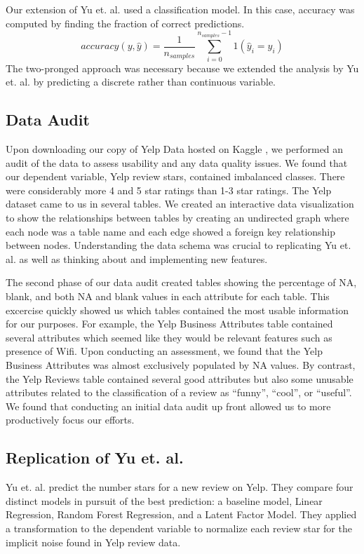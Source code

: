 \documentclass[12pt]{article}
\begin{document}
Our extension of Yu et. al. \cite{yu2015restaurants} used a classification model. In this
case, accuracy was computed by finding the fraction of correct predictions.
\[
accuracy(y, \hat{y}) = \frac{1}{n_{samples}} \sum_{i=0}^{n_{samples} - 1} 1(\hat{y}_i = y_i)
\]
The two-pronged approach was necessary because we extended the analysis by Yu et. al.
\cite{yu2015restaurants} by predicting a discrete rather than continuous variable.

\subsection{Data Audit}

Upon downloading our copy of Yelp Data hosted on Kaggle \cite{YelpData59:online}, we performed
an audit of the data to assess usability and any data quality issues. We found that our
dependent variable, Yelp review stars, contained imbalanced classes. There were considerably
more 4 and 5 star ratings than 1-3 star ratings. The Yelp dataset came to us in several tables.
We created an interactive data visualization to show the relationships between tables by creating
an undirected graph where each node was a table name and each edge showed a foreign key
relationship between nodes. Understanding the data schema was crucial to replicating
Yu et. al. \cite{yu2015restaurants} as well as thinking about and implementing new features.

The second phase of our data audit created tables showing the percentage of NA, blank, and
both NA and blank values in each attribute for each table. This excercise quickly showed us
which tables contained the most usable information for our purposes. For example, the Yelp
Business Attributes table contained several attributes which seemed like they would be
relevant features such as presence of Wifi. Upon conducting an assessment, we found that
the Yelp Business Attributes was almost exclusively populated by NA values. By contrast, the
Yelp Reviews table contained several good attributes but also some unusable attributes
related to the classification of a review as ``funny'', ``cool'', or ``useful''. We found
that conducting an initial data audit up front allowed us to more productively focus our
efforts.

\subsection{Replication of Yu et. al.}

Yu et. al. \cite{yu2015restaurants} predict the number stars for a new review on Yelp.
They compare four distinct models in pursuit of the best prediction: a baseline model,
Linear Regression, Random Forest Regression, and a Latent Factor Model. They applied a
transformation to the dependent variable to normalize each review star for the implicit
noise found in Yelp review data.
\end{document}
